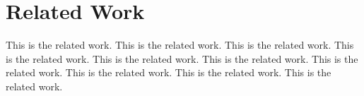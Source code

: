 \section{Related Work}
\label{sec:2}

This is the related work. This is the related work. This is the related work. This is the related work. This is the related work. This is the related work. This is the related work. This is the related work. This is the related work. This is the related work. 